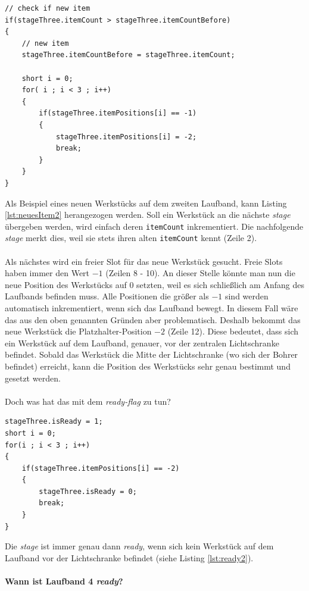 \documentclass[fontsize=11pt,a4paper,final]{scrartcl}[2003/01/01]
\begin{document}
\begin{lstlisting}[caption={Beispiel: Neues Werkstück auf dem zweiten Laufband},label={lst:neuesItem2}]
// check if new item
if(stageThree.itemCount > stageThree.itemCountBefore)
{
   	// new item
   	stageThree.itemCountBefore = stageThree.itemCount;
   	
   	short i = 0;
   	for( i ; i < 3 ; i++)
   	{
   		if(stageThree.itemPositions[i] == -1)
   		{
   			stageThree.itemPositions[i] = -2;
   			break;
   		}
   	}
}
\end{lstlisting}
Als Beispiel eines neuen Werkstücks auf dem zweiten Laufband, kann Listing \ref{lst:neuesItem2} herangezogen werden.
Soll ein Werkstück an die nächste \textit{stage} übergeben werden, wird einfach deren \lstinline|itemCount| inkrementiert. Die nachfolgende \textit{stage} merkt dies, weil sie stets ihren alten \lstinline|itemCount| kennt (Zeile 2). \\ \\
Als nächstes wird ein freier Slot für das neue Werkstück gesucht. Freie Slots haben immer den Wert $-1$ (Zeilen 8 - 10). An dieser Stelle könnte man nun die neue Position des Werkstücks auf $0$ setzten, weil es sich schließlich am Anfang des Laufbands befinden muss. Alle Positionen die größer als $-1$ sind werden automatisch inkrementiert, wenn sich das Laufband bewegt. In diesem Fall wäre das aus den oben genannten Gründen aber problematisch. Deshalb bekommt das neue Werkstück die Platzhalter-Position $-2$ (Zeile 12). Diese bedeutet, dass sich ein Werkstück auf dem Laufband, genauer, vor der zentralen Lichtschranke befindet. 
Sobald das Werkstück die Mitte der Lichtschranke (wo sich der Bohrer befindet) erreicht, kann die Position des Werkstücks sehr genau bestimmt und gesetzt werden. \\ \\
Doch was hat das mit dem \textit{ready-flag} zu tun? 
\begin{lstlisting}[caption={Beispiel: Ist Laufband 2 \textit{ready}?},label={lst:ready2}]
stageThree.isReady = 1;
short i = 0;
for(i ; i < 3 ; i++)
{
	if(stageThree.itemPositions[i] == -2)
	{
		stageThree.isReady = 0;
		break;
	}
}
\end{lstlisting}
Die \textit{stage} ist immer genau dann \textit{ready}, wenn sich kein Werkstück auf dem Laufband vor der Lichtschranke befindet (siehe Listing \ref{lst:ready2}). \\ \\
\textbf{Wann ist Laufband 4 \textit{ready}?} \\
\end{document}
